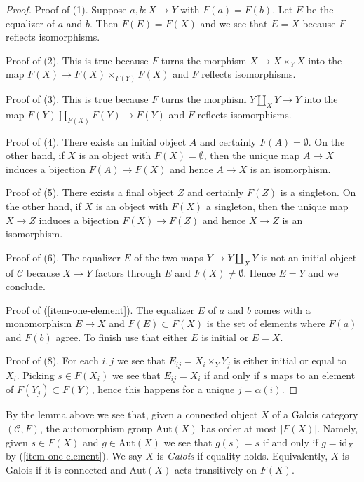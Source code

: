 \begin{proof}
Proof of (1). Suppose $a, b : X \to Y$ with $F(a) = F(b)$.
Let $E$ be the equalizer of $a$ and $b$. Then $F(E) = F(X)$
and we see that $E = X$ because $F$ reflects isomorphisms.

\medskip\noindent
Proof of (2). This is true because $F$ turns the morphism $X \to X \times_Y X$
into the map $F(X) \to F(X) \times_{F(Y)} F(X)$ and $F$ reflects isomorphisms.

\medskip\noindent
Proof of (3). This is true because $F$ turns the morphism $Y \amalg_X Y \to Y$
into the map $F(Y) \amalg_{F(X)} F(Y) \to F(Y)$ and $F$ reflects isomorphisms.

\medskip\noindent
Proof of (4). There exists an initial object $A$ and certainly
$F(A) = \emptyset$. On the other hand, if $X$ is an object with
$F(X) = \emptyset$, then the unique map $A \to X$ induces a bijection
$F(A) \to F(X)$ and hence $A \to X$ is an isomorphism.

\medskip\noindent
Proof of (5). There exists a final object $Z$ and certainly
$F(Z)$ is a singleton. On the other hand, if $X$ is an object with
$F(X)$ a singleton, then the unique map $X \to Z$ induces a bijection
$F(X) \to F(Z)$ and hence $X \to Z$ is an isomorphism.

\medskip\noindent
Proof of (6). The equalizer $E$ of the two maps $Y \to Y \amalg_X Y$ is not
an initial object of $\mathcal{C}$ because $X \to Y$ factors through $E$
and $F(X) \not = \emptyset$. Hence $E = Y$ and we conclude.

\medskip\noindent
Proof of (\ref{item-one-element}).
The equalizer $E$ of $a$ and $b$ comes with a monomorphism
$E \to X$ and $F(E) \subset F(X)$ is the set of elements where
$F(a)$ and $F(b)$ agree. To finish use that either $E$ is initial
or $E = X$.

\medskip\noindent
Proof of (8). For each $i, j$ we see that $E_{ij} = X_i \times_Y Y_j$
is either initial or equal to $X_i$. Picking $s \in F(X_i)$
we see that $E_{ij} = X_i$ if and only if $s$ maps to an element
of $F(Y_j) \subset F(Y)$, hence this happens for a unique $j = \alpha(i)$.
\end{proof}

\noindent
By the lemma above we see that, given a connected object $X$ of a
Galois category $(\mathcal{C}, F)$, the automorphism group
$\text{Aut}(X)$ has order at most $|F(X)|$. Namely, given $s \in F(X)$
and $g \in \text{Aut}(X)$ we see that $g(s) = s$ if and only
if $g = \text{id}_X$ by (\ref{item-one-element}).
We say $X$ is {\it Galois} if equality holds.
Equivalently, $X$ is Galois if it is connected and
$\text{Aut}(X)$ acts transitively on $F(X)$.

